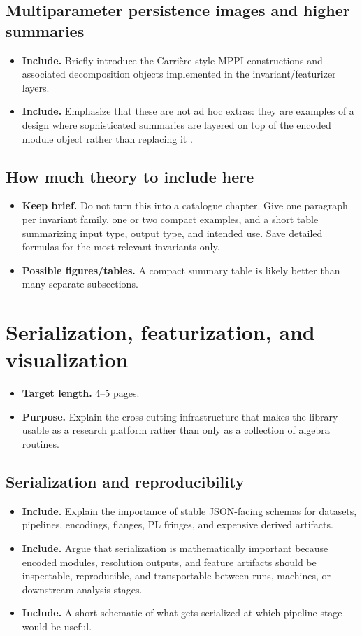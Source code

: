 \documentclass[11pt]{article}
\newenvironment{plan}{\begin{itemize}[leftmargin=1.6em,itemsep=0.35em,topsep=0.25em]}{\end{itemize}}
\newcommand{\target}[1]{\item \textbf{Target length.} #1}
\newcommand{\purpose}[1]{\item \textbf{Purpose.} #1}
\newcommand{\includeitems}[1]{\item \textbf{Include.} #1}
\newcommand{\keepbrief}[1]{\item \textbf{Keep brief.} #1}
\newcommand{\figures}[1]{\item \textbf{Possible figures/tables.} #1}
\begin{document}
\subsection{Multiparameter persistence images and higher summaries}

\begin{plan}
    \includeitems{Briefly introduce the Carri\`ere-style MPPI constructions and associated decomposition objects implemented in the invariant/featurizer layers.}
    \includeitems{Emphasize that these are not ad hoc extras: they are examples of a design where sophisticated summaries are layered on top of the encoded module object rather than replacing it \cite{LS24}.}
\end{plan}

\subsection{How much theory to include here}

\begin{plan}
    \keepbrief{Do not turn this into a catalogue chapter. Give one paragraph per invariant family, one or two compact examples, and a short table summarizing input type, output type, and intended use. Save detailed formulas for the most relevant invariants only.}
    \figures{A compact summary table is likely better than many separate subsections.}
\end{plan}

\section{Serialization, featurization, and visualization}\label{sec:cross-cutting-layers}

\begin{plan}
    \target{4--5 pages.}
    \purpose{Explain the cross-cutting infrastructure that makes the library usable as a research platform rather than only as a collection of algebra routines.}
\end{plan}

\subsection{Serialization and reproducibility}

\begin{plan}
    \includeitems{Explain the importance of stable JSON-facing schemas for datasets, pipelines, encodings, flanges, PL fringes, and expensive derived artifacts.}
    \includeitems{Argue that serialization is mathematically important because encoded modules, resolution outputs, and feature artifacts should be inspectable, reproducible, and transportable between runs, machines, or downstream analysis stages.}
    \includeitems{A short schematic of what gets serialized at which pipeline stage would be useful.}
\end{plan}
\end{document}
